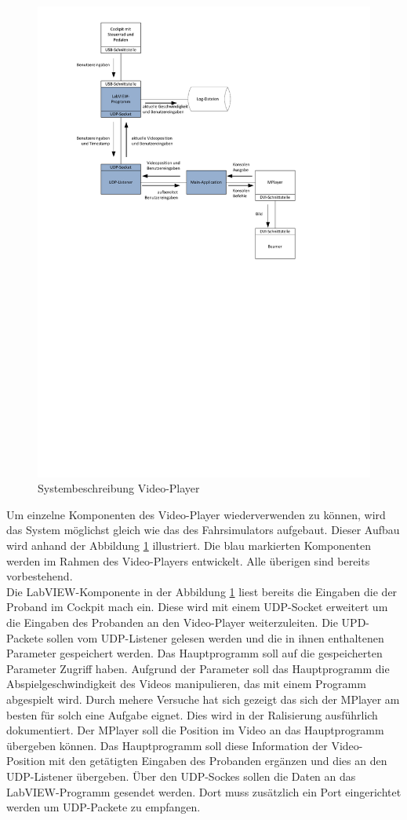 \begin{figure}[H]
\centering 
\includegraphics[width=0.8\linewidth]{src/Systembeschreibung_VideoPlayer.pdf}
\caption{Systembeschreibung Video-Player} %
\label{Systembeschreibung Video-Player} %
\end{figure}
Um einzelne Komponenten des Video-Player wiederverwenden zu können, wird das System möglichst gleich wie das des Fahrsimulators aufgebaut. Dieser Aufbau wird anhand der Abbildung \ref{Systembeschreibung Video-Player} illustriert.  Die blau markierten Komponenten werden im Rahmen des Video-Players entwickelt. Alle überigen sind bereits vorbestehend. \\
Die LabVIEW-Komponente in der Abbildung \ref{Systembeschreibung Video-Player} liest bereits die Eingaben die der Proband im Cockpit mach ein. Diese wird mit einem UDP-Socket erweitert um die Eingaben des Probanden an den Video-Player weiterzuleiten. Die UPD-Packete sollen vom UDP-Listener gelesen werden und die in ihnen enthaltenen Parameter gespeichert werden. Das Hauptprogramm soll auf die gespeicherten Parameter Zugriff haben. Aufgrund der Parameter soll das Hauptprogramm die Abspielgeschwindigkeit des Videos manipulieren, das mit einem Programm abgespielt wird. Durch mehere Versuche hat sich gezeigt das sich der MPlayer am besten für solch eine Aufgabe eignet. Dies wird in der Ralisierung ausführlich dokumentiert. Der MPlayer soll die Position im Video an das Hauptprogramm übergeben können. Das Hauptprogramm soll diese Information der Video-Position mit den getätigten Eingaben des Probanden ergänzen und dies an den UDP-Listener übergeben. Über den UDP-Sockes sollen die Daten an das LabVIEW-Programm gesendet werden. Dort muss zusätzlich ein Port eingerichtet werden um UDP-Packete zu empfangen.
